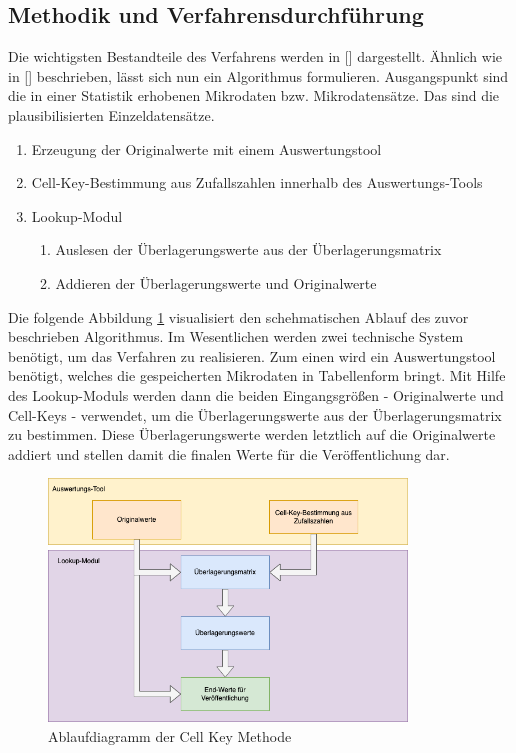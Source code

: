\subsection{Methodik und Verfahrensdurchführung}%

Die wichtigsten Bestandteile des Verfahrens werden in [\cite{Enderle}] dargestellt. Ähnlich wie in [\cite{Wipke}] beschrieben, lässt sich nun ein Algorithmus formulieren. Ausgangspunkt sind die in einer Statistik erhobenen Mikrodaten bzw. Mikrodatensätze. Das sind die plausibilisierten Einzeldatensätze. 

\begin{enumerate}
    \item Erzeugung der Originalwerte mit einem Auswertungstool
    \item Cell-Key-Bestimmung aus Zufallszahlen innerhalb des Auswertungs-Tools
    \item Lookup-Modul
    \begin{enumerate}
        \item Auslesen der Überlagerungswerte aus der Überlagerungsmatrix
        \item Addieren der Überlagerungswerte und Originalwerte
    \end{enumerate}
\end{enumerate}

Die folgende Abbildung \ref{fig_ckm_chart} visualisiert den schehmatischen Ablauf des zuvor beschrieben Algorithmus. Im Wesentlichen werden zwei technische System benötigt, um das Verfahren zu realisieren. Zum einen wird ein Auswertungstool benötigt, welches die gespeicherten Mikrodaten in Tabellenform bringt. Mit Hilfe des Lookup-Moduls werden dann die beiden Eingangsgrö\ss en - Originalwerte und Cell-Keys - verwendet, um die Überlagerungswerte aus der Überlagerungsmatrix zu bestimmen. Diese Überlagerungswerte werden letztlich auf die Originalwerte addiert und stellen damit die finalen Werte für die Veröffentlichung dar. 

\begin{figure}[H]
    \begin{center}
        \includegraphics[width=0.85\textwidth]{img/ckm_flow.png}
        \caption{Ablaufdiagramm der Cell Key Methode}
        \label{fig_ckm_chart}
    \end{center}
\end{figure}

